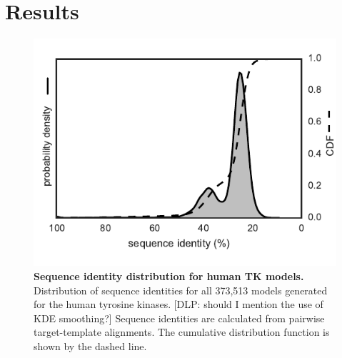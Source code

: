 \documentclass[aps,pre,twocolumn,nofootinbib,superscriptaddress,linenumbers]{revtex4-1}
\begin{document}
\label{section:design}

\section{Results}
\label{section:results}

\begin{figure}[tb]
  \centering
    \includegraphics[width=1.0\textwidth]{seqid_dist/seqid_dist}
    \caption{{\bf Sequence identity distribution for human TK models.}
    Distribution of sequence identities for all 373,513 models generated for the human tyrosine kinases.
    {\color{blue}[DLP: should I mention the use of KDE smoothing?]}
    Sequence identities are calculated from pairwise target-template alignments.
    The cumulative distribution function is shown by the dashed line.
    }
  \label{figseqid_dist}
\end{figure}
\end{document}
